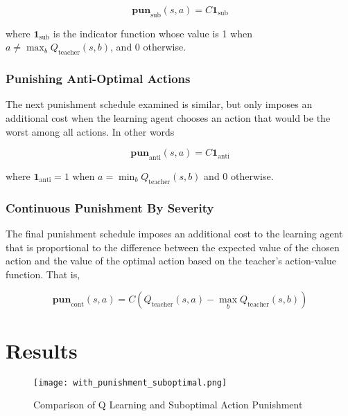 \documentclass[twocolumn]{article}
\begin{document}
\begin{equation}\textbf{pun}_{\text{sub}}(s,a) = C \textbf{1}_{\text{sub}}\label{eq:sub}\end{equation}

where \(\textbf{1}_{\text{sub}}\) is the indicator function whose value
is 1 when \(a \neq \max_{b}Q_{\text{teacher}}(s,b)\), and 0 otherwise.

\hypertarget{punishing-anti-optimal-actions}{\subsubsection{Punishing Anti-Optimal
Actions}\label{punishing-anti-optimal-actions}}

The next punishment schedule examined is similar, but only imposes an
additional cost when the learning agent chooses an action that would be
the worst among all actions. In other words

\begin{equation}
\textbf{pun}_{\text{anti}}(s,a) = C \textbf{1}_{\text{anti}}
\label{eq:anti}\end{equation}

where \(\textbf{1}_{\text{anti}} = 1\) when
\(a = \min_b Q_{\text{teacher}}(s,b)\) and 0 otherwise.

\hypertarget{continuous-punishment-by-severity}{\subsubsection{Continuous Punishment By
Severity}\label{continuous-punishment-by-severity}}

The final punishment schedule imposes an additional cost to the learning
agent that is proportional to the difference between the expected value
of the chosen action and the value of the optimal action based on the
teacher's action-value function. That is,

\begin{equation}
\textbf{pun}_{\text{cont}}(s,a) = C (Q_{\text{teacher}}(s,a) - \max_b Q_{\text{teacher}}(s,b))
\label{eq:cont}\end{equation}

\hypertarget{results}{\section{Results}\label{results}}

\begin{figure}
\hypertarget{fig:withpun}{\centering
\texttt{[image: with\_punishment\_suboptimal.png]}
\caption{Comparison of Q Learning and Suboptimal Action
Punishment}\label{fig:withpun}
}
\end{figure}
\end{document}
